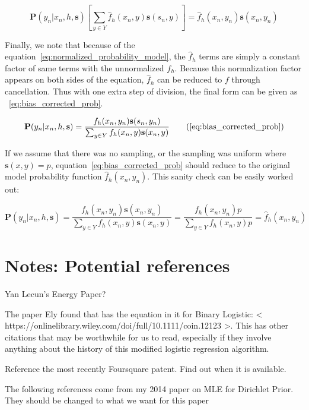 \documentclass[twoside]{article}
\begin{document}
\begin{appendices}
\[\mathbf{P}(y_n|x_n,h,\mathbf{s})\left [\sum_{y \in Y}\hat{f}_h(x_n,y)\mathbf{s}(s_n,y) \right ]=\hat{f}_h(x_n,y_n)\mathbf{s}(x_n,y_n) \]

Finally, we note that because of the equation~\eqref{eq:normalized_probability_model}, the \(\hat{f}_h\) terms are simply a constant factor of same terms with the unnormalized \(f_h\). Because this normalization factor appears on both sides of the equation, \(\hat{f}_h\) can be reduced to \(f\) through cancellation. Thus with one extra step of division, the final form can be given as ~\eqref{eq:bias_corrected_prob}.

\begin{equation}
\mathbf{P}(y_n|x_n,h,\mathbf{s})=\dfrac{f_h(x_n,y_n)\mathbf{s}(s_n,y_n)}{\sum_{y \in Y}f_h(x_n,y)\mathbf{s}(x_n,y)}
\tag{\ref{eq:bias_corrected_prob}}
\end{equation}

If we assume that there was no sampling, or the sampling was uniform where \(\mathbf{s}(x,y)=p\), equation~\eqref{eq:bias_corrected_prob} should reduce to the original model probability function \(\hat{f}_h(x_n,y_n)\). This sanity check can be easily worked out:

\[\mathbf{P}(y_n|x_n,h,\mathbf{s})=\frac{f_h(x_n,y_n)\mathbf{s}(x_n,y_n)}{\sum_{y \in Y}f_h(x_n,y)\mathbf{s}(x_n,y)}=\frac{f_h(x_n,y_n)p}{\sum_{y \in Y}f_h(x_n,y)p} =\hat{f}_h(x_n,y_n)\]

\end{appendices}

\section{Notes: Potential references}

Yan Lecun’s Energy Paper?

The paper Ely found that has the equation in it for Binary Logistic: < https://onlinelibrary.wiley.com/doi/full/10.1111/coin.12123 >. This has other citations that may be worthwhile for us to read, especially if they involve anything about the history of this modified logistic regression algorithm.

Reference the most recently Foursquare patent. Find out when it is available.

The following references come from my 2014 paper on MLE for Dirichlet Prior. They should be changed to what we want for this paper

\end{document}
